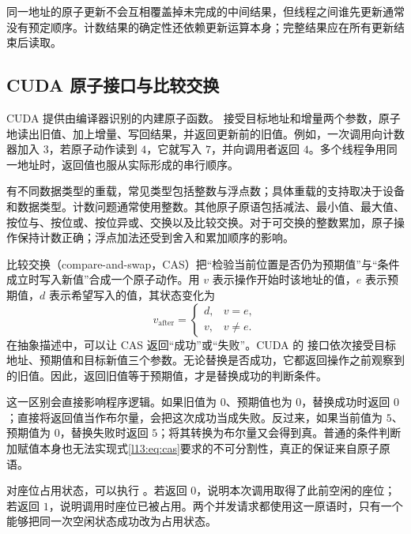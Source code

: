 \begin{keybox}[title={原子性与顺序}]
同一地址的原子更新不会互相覆盖掉未完成的中间结果，但线程之间谁先更新通常没有预定顺序。计数结果的确定性还依赖更新运算本身；完整结果应在所有更新结束后读取。
\end{keybox}

\subsection{CUDA 原子接口与比较交换}

CUDA 提供由编译器识别的内建原子函数。\mbox{} 接受目标地址和增量两个参数，原子地读出旧值、加上增量、写回结果，并返回更新前的旧值。例如，一次调用向计数器加入 $3$，若原子动作读到 $4$，它就写入 $7$，并向调用者返回 $4$。多个线程争用同一地址时，返回值也服从实际形成的串行顺序。

\mbox{} 有不同数据类型的重载，常见类型包括整数与浮点数；具体重载的支持取决于设备和数据类型。计数问题通常使用整数。其他原子原语包括减法、最小值、最大值、按位与、按位或、按位异或、交换以及比较交换。对于可交换的整数累加，原子操作保持计数正确；浮点加法还受到舍入和累加顺序的影响。

比较交换（compare-and-swap，CAS）把“检验当前位置是否仍为预期值”与“条件成立时写入新值”合成一个原子动作。用 $v$ 表示操作开始时该地址的值，$e$ 表示预期值，$d$ 表示希望写入的值，其状态变化为
\begin{equation}
v_{\mathrm{after}}=
\begin{cases}
d, & v=e,\\
v, & v\ne e.
\end{cases}
\label{l13:eq:cas}
\end{equation}
在抽象描述中，可以让 CAS 返回“成功”或“失败”。CUDA 的 \mbox{} 接口依次接受目标地址、预期值和目标新值三个参数。无论替换是否成功，它都返回操作之前观察到的旧值。因此，返回旧值等于预期值，才是替换成功的判断条件。

这一区别会直接影响程序逻辑。如果旧值为 $0$、预期值也为 $0$，替换成功时返回 $0$；直接将返回值当作布尔量，会把这次成功当成失败。反过来，如果当前值为 $5$、预期值为 $0$，替换失败时返回 $5$；将其转换为布尔量又会得到真。普通的条件判断加赋值本身也无法实现式\eqref{l13:eq:cas}要求的不可分割性，真正的保证来自原子原语。

对座位占用状态，可以执行 \mbox{}。若返回 $0$，说明本次调用取得了此前空闲的座位；若返回 $1$，说明调用时座位已被占用。两个并发请求都使用这一原语时，只有一个能够把同一次空闲状态成功改为占用状态。


